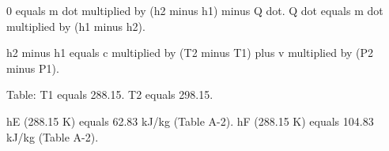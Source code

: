 0 equals m dot multiplied by (h2 minus h1) minus Q dot.  
Q dot equals m dot multiplied by (h1 minus h2).  

h2 minus h1 equals c multiplied by (T2 minus T1) plus v multiplied by (P2 minus P1).  

Table:  
T1 equals 288.15.  
T2 equals 298.15.  

hE (288.15 K) equals 62.83 kJ/kg (Table A-2).  
hF (288.15 K) equals 104.83 kJ/kg (Table A-2).